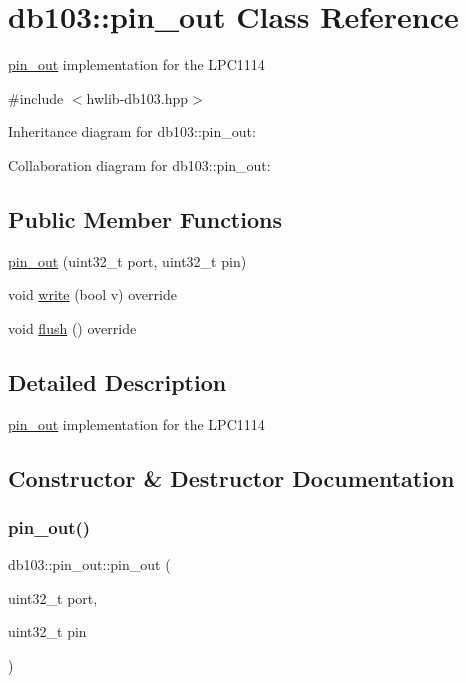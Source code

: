 \hypertarget{classdb103_1_1pin__out}{}\section{db103\+:\+:pin\+\_\+out Class Reference}
\label{classdb103_1_1pin__out}


\hyperlink{classdb103_1_1pin__out}{pin\+\_\+out} implementation for the L\+P\+C1114  




{\ttfamily \#include $<$hwlib-\/db103.\+hpp$>$}



Inheritance diagram for db103\+:\+:pin\+\_\+out\+:


Collaboration diagram for db103\+:\+:pin\+\_\+out\+:
\subsection*{Public Member Functions}
\begin{DoxyCompactItemize}
\item 
\hyperlink{classdb103_1_1pin__out_a30fcf182dc199f65fe085770f5f0c70b}{pin\+\_\+out} (uint32\+\_\+t port, uint32\+\_\+t pin)
\item 
void \hyperlink{classdb103_1_1pin__out_adb5167058deb8fbd3e4c1bbdb456a6e3}{write} (bool v) override
\item 
void \hyperlink{classdb103_1_1pin__out_ad94271fe261522bf18b35e084076c12d}{flush} () override
\end{DoxyCompactItemize}


\subsection{Detailed Description}
\hyperlink{classdb103_1_1pin__out}{pin\+\_\+out} implementation for the L\+P\+C1114 

\subsection{Constructor \& Destructor Documentation}
\mbox{\label{classdb103_1_1pin__out_a30fcf182dc199f65fe085770f5f0c70b}} 
\subsubsection{\texorpdfstring{pin\+\_\+out()}{pin\_out()}}
{\footnotesize\ttfamily db103\+::pin\+\_\+out\+::pin\+\_\+out (\begin{DoxyParamCaption}\item[{uint32\+\_\+t}]{port,  }\item[{uint32\+\_\+t}]{pin }\end{DoxyParamCaption})\hspace{0.3cm}{\ttfamily [inline]}}

